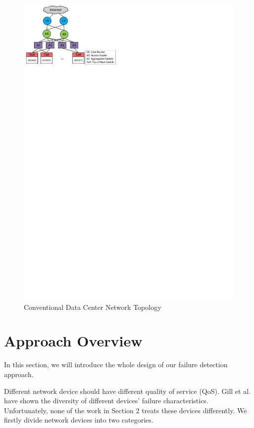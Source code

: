 \documentclass{sig-alternate-05-2015}
\begin{document}
\begin{figure}
\centering
\includegraphics{topology}
\caption{Conventional Data Center Network Topology}
\end{figure}


\section{Approach Overview}
In this section, we will introduce the whole design of our failure detection approach.

Different network device should have different quality of service (QoS). Gill et al. \cite{gill2011understanding} have shown the diversity of different devices' failure characteristics. Unfortunately, none of the work in Section 2 treats these devices differently. We firstly divide network devices into two categories.
\end{document}

